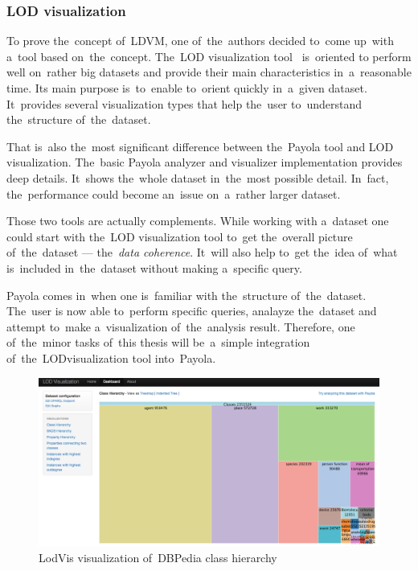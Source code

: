 \subsubsection{LOD visualization}
\label{rw:lodvis}
To prove the~concept of~LDVM, one of~the~authors decided to~come up~with a~tool 
based on~the~concept. The~LOD visualization tool~\cite{lodvis} is~oriented
to perform well on~rather big datasets and 
provide their main characteristics in~a~reasonable time. Its main purpose is~to~enable to~orient quickly in~a~given dataset. It~provides several 
visualization types that help the~user to~understand the~structure of~the~dataset.

That is~also the~most significant difference between the~Payola tool and LOD 
visualization. The~basic Payola analyzer and visualizer implementation provides 
deep details. It~shows the~whole dataset in~the~most possible detail. In~fact, 
the~performance could become an~issue on~a~rather larger dataset.

Those two tools are actually complements. While working with a~dataset one could 
start with the~LOD visualization tool to~get the~overall picture of~the~dataset --- 
the~\emph{data coherence}. It~will also help to~get the~idea of~what is~included in~the~dataset without making a~specific query.

Payola comes in~when one is~familiar with the~structure of~the~dataset. The~user 
is now able to~perform specific queries, analayze the~dataset and attempt to~make a~visualization of~the~analysis result. Therefore, one of~the~minor tasks of~this thesis
will be~a~simple integration of~the~LODvisualization tool into~Payola.

\begin{figure}
	\centering
	\includegraphics[width=140mm]{img/lodvis.png}
	\caption{LodVis visualization of~DBPedia class hierarchy}
	\label{fig:lodvis}
\end{figure}

